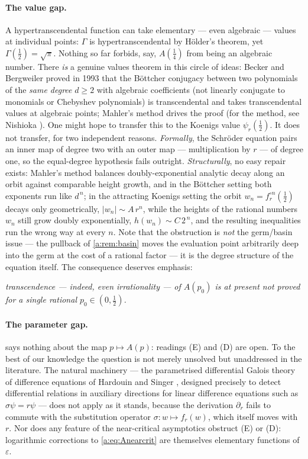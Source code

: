 \paragraph{The value gap.}
A hypertranscendental function can take elementary --- even algebraic --- values
at individual points: $\Gamma$ is hypertranscendental by H\"older's theorem, yet
$\Gamma(\tfrac12)=\sqrt{\pi}$. Nothing so far forbids, say, $A(\tfrac14)$ from
being an algebraic number. There \emph{is} a genuine values theorem in this circle
of ideas: Becker and Bergweiler proved in 1993 \cite{Becker1993} that the
B\"ottcher conjugacy between two polynomials of the \emph{same degree} $d\ge2$
with algebraic coefficients (not linearly conjugate to monomials or Chebyshev
polynomials) is transcendental and takes transcendental values at algebraic
points; Mahler's method drives the proof (for the method, see Nishioka
\cite{Nishioka1996}). One might hope to transfer this to the Koenigs value
$\psi_r(\tfrac12)$. It does not transfer, for two independent reasons.
\emph{Formally}, the Schr\"oder equation pairs an inner map of degree two with an
outer map --- multiplication by $r$ --- of degree one, so the equal-degree
hypothesis fails outright. \emph{Structurally}, no easy repair exists: Mahler's
method balances doubly-exponential analytic decay along an orbit against
comparable height growth, and in the B\"ottcher setting both exponents run like
$d^{\,n}$; in the attracting Koenigs setting the orbit
$w_n=f_r^{\circ n}(\tfrac12)$ decays only geometrically, $|w_n|\sim A\,r^{n}$,
while the heights of the rational numbers $w_n$ still grow doubly exponentially,
$h(w_n)\sim C\,2^{\,n}$, and the resulting inequalities run the wrong way at every
$n$. Note that the obstruction is \emph{not} the germ/basin issue --- the pullback
of \cref{a:rem:basin} moves the evaluation point arbitrarily deep into the germ at
the cost of a rational factor --- it is the degree structure of the equation
itself. The consequence deserves emphasis:
\begin{center}
\emph{transcendence --- indeed, even irrationality --- of $A(p_0)$ is at present
not proved for a single rational $p_0\in(0,\tfrac12)$.}
\end{center}

\paragraph{The parameter gap.}
 says nothing about the map $p\mapsto A(p)$: readings (E) and
(D) are open. To the best of our knowledge the question is not merely unsolved but
unaddressed in the literature. The natural machinery --- the parametrised
differential Galois theory of difference equations of Hardouin and Singer
\cite{HardouinSinger2008}, designed precisely to detect differential relations in
auxiliary directions for linear difference equations such as $\sigma\psi=r\psi$
--- does not apply as it stands, because the derivation $\partial_r$ fails to
commute with the substitution operator $\sigma\colon w\mapsto f_r(w)$, which
itself moves with $r$. Nor does any feature of the near-critical asymptotics
obstruct (E) or (D): logarithmic corrections to \cref{a:eq:Anearcrit} are
themselves elementary functions of $\varepsilon$.

